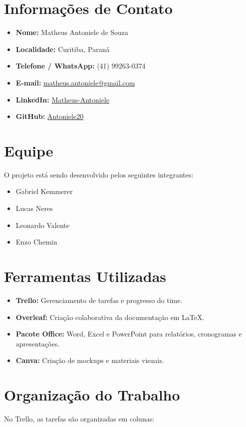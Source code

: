\documentclass[a4paper,12pt]{article}
\begin{document}
\section{Informações de Contato}
\begin{itemize}
  \item \textbf{Nome:} Matheus Antoniele de Souza
  \item \textbf{Localidade:} Curitiba, Paraná
  \item \textbf{Telefone / WhatsApp:} (41) 99263-0374
  \item \textbf{E-mail:} \href{mailto:matheus.antoniele@gmail.com}{matheus.antoniele@gmail.com}
  \item \textbf{LinkedIn:} \href{https://www.linkedin.com/in/matheus-antoniel-a756b634b}{Matheus-Antoniele}
  \item \textbf{GitHub:} \href{https://github.com/Antoniele20}{Antoniele20}
\end{itemize}

\section{Equipe}
O projeto está sendo desenvolvido pelos seguintes integrantes:

\begin{itemize}
  \item Gabriel Kemmerer
  \item Lucas Neres
  \item Leonardo Valente
  \item Enzo Chemin
\end{itemize}

\section{Ferramentas Utilizadas}
\begin{itemize}
  \item \textbf{Trello:} Gerenciamento de tarefas e progresso do time.
  \item \textbf{Overleaf:} Criação colaborativa da documentação em LaTeX.
  \item \textbf{Pacote Office:} Word, Excel e PowerPoint para relatórios, cronogramas e apresentações.
  \item \textbf{Canva:} Criação de mockups e materiais visuais.
\end{itemize}

\section{Organização do Trabalho}
No Trello, as tarefas são organizadas em colunas:
\end{document}
